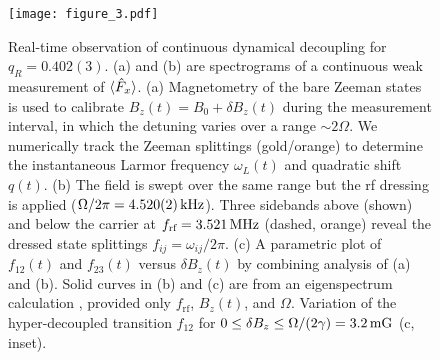 \documentclass[aps,prl,reprint,superscriptaddress,floatfix]{revtex4-1}
\begin{document}
\begin{figure}
    \texttt{[image: figure\_3.pdf]}
    \caption{
    \label{fig:acquisition_pipeline}
        Real-time observation of continuous dynamical decoupling for $q_R = 0.402(3)$.
        (a) and (b) are spectrograms of a continuous weak measurement of $\langle \hat{F}_x \rangle$.
        (a) Magnetometry of the bare Zeeman states is used to calibrate $B_z(t) = B_0 + \delta B_z(t)$ during the measurement interval, in which the detuning varies over a range $\sim 2\Omega$.
        We numerically track the Zeeman splittings (gold/orange) to determine the instantaneous Larmor frequency $\omega_L(t)$ and quadratic shift $q(t)$.
       (b) The field is swept over the same range but the rf dressing is applied ($\Omega/2\pi = \unit[4.520(2)]{kHz}$).
       Three sidebands above (shown) and below the carrier at $f_{\text{rf}}=\unit[3.521]{MHz}$ (dashed, orange) reveal the dressed state splittings $f_{ij} = \omega_{ij}/2\pi$.
       (c) A parametric plot of $f_{12}(t)$ and $f_{23}(t)$ versus $\delta B_z(t)$ by combining analysis of (a) and (b).
       Solid curves in (b) and (c) are from an eigenspectrum calculation
       , provided only $f_{\text{rf}}$, $B_z(t)$, and $\Omega$.
       Variation of the hyper-decoupled transition $f_{12}$ for $0 \leq \delta B_z \leq \Omega/(2\gamma) = \unit[3.2]{mG}$ (c, inset).
    }
\end{figure}
\end{document}
